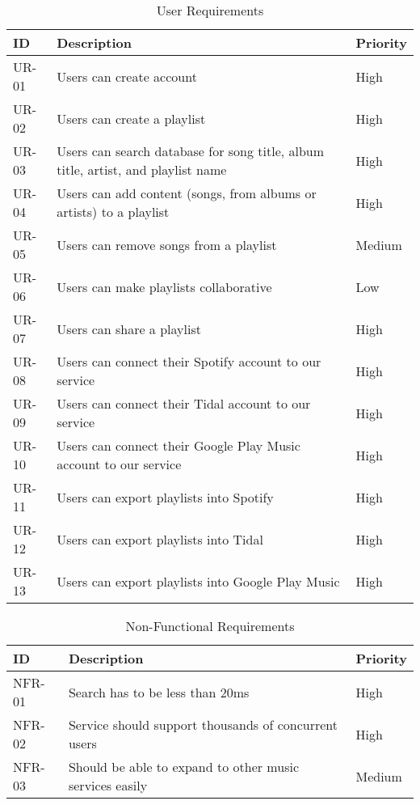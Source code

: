 \documentclass[12pt]{article}
\begin{document}
	\begin{table*}
		\centering
		\label{tab:ur}
		\caption*{User Requirements}
		\begin{tabularx}{450pt}{lXl}
			ID & Description & Priority\\\hline
			UR-01 & Users can create account & High \\
			UR-02 & Users can create a playlist & High \\
			UR-03 & Users can search database for song title, album title,
			artist, and playlist name & High \\
			UR-04 & Users can add content (songs, from albums or artists) to a playlist & High \\
			UR-05 & Users can remove songs from a playlist & Medium \\
			UR-06 & Users can make playlists collaborative & Low \\
			UR-07 & Users can share a playlist & High \\
			UR-08 & Users can connect their Spotify account to our service & High \\
			UR-09 & Users can connect their Tidal account to our service & High \\
			UR-10 & Users can connect their Google Play Music account to our service & High \\
			UR-11 & Users can export playlists into Spotify & High \\
			UR-12 & Users can export playlists into Tidal & High \\
			UR-13 & Users can export playlists into Google Play Music & High \\
		\end{tabularx}
	\end{table*}
	\begin{table*}
		\centering
		\label{tab:nfr}
		\caption*{Non-Functional Requirements}
		\begin{tabularx}{450pt}{lXl}
			ID & Description & Priority\\\hline
			NFR-01 & Search has to be less than 20ms & High \\
			NFR-02 & Service should support thousands of concurrent users & High \\
			NFR-03 & Should be able to expand to other music services easily & Medium \\
		\end{tabularx}
	\end{table*}
	
	
\end{document}
